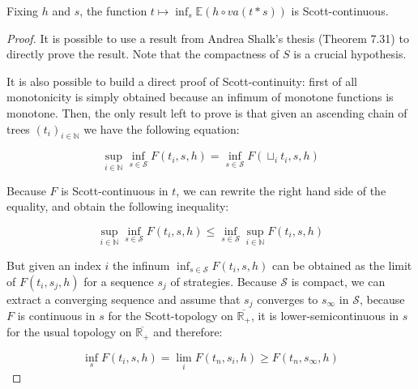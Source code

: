 \begin{ensps}
\begin{alemma}
    \label{lem:mixedscottcontinuous}
    Fixing $h$ and $s$, 
    the function $t \mapsto \inf_s \mathbb{E} (h \circ va(t*s))$
    is Scott-continuous.
\end{alemma}

\begin{proof}
    It is possible to use a result from Andrea Shalk's thesis 
    \cite{AndreaShalk} (Theorem 7.31)
    to directly prove the result. Note that 
    the compactness of $S$ is a crucial hypothesis. 

    It is also possible to build a direct proof of Scott-continuity:
    first of all monotonicity is simply obtained because an infimum 
    of monotone functions is monotone. Then, the only result left 
    to prove is that given an ascending chain of trees $(t_i)_{i \in \mathbb{N}}$
    we have the following equation:

    \begin{equation*}
        \sup_{i \in \mathbb{N}} \inf_{s \in \mathcal{S}} F(t_i,s,h) = 
    \inf_{s \in \mathcal{S}} F (\sqcup_i t_i, s, h)
    \end{equation*}
    
    Because $F$ is Scott-continuous in $t$, we can rewrite the right hand 
    side of the equality, and obtain the following inequality: 

    \begin{equation*}
        \sup_{i \in \mathbb{N}} \inf_{s \in \mathcal{S}} F(t_i,s,h) \leq 
        \inf_{s \in \mathcal{S}} \sup_{i \in \mathbb{N}} F (t_i, s, h)
    \end{equation*}
    
    But given an index $i$ the infinum $\inf_{s \in \mathcal{S}} F(t_i,s,h)$ 
    can be obtained as the limit of $F(t_i,s_j,h)$ for a sequence $s_j$ of
    strategies.
    Because 
    $\mathcal{S}$ is compact, we can extract a converging sequence and 
    assume that $s_j$ converges to $s_\infty$ in $\mathcal{S}$, because 
    $F$ is continuous in $s$ for the Scott-topology on
    $\overline{\mathbb{R}_+}$, it is lower-semicontinuous in $s$ 
    for the usual topology on $\overline{\mathbb{R}_+}$ and therefore:

    \begin{equation*}
        \inf_s F(t_i, s, h) = \lim_i F(t_n, s_i, h) 
                            \geq F (t_n, s_\infty, h)
    \end{equation*}


\end{proof}
\end{ensps}
